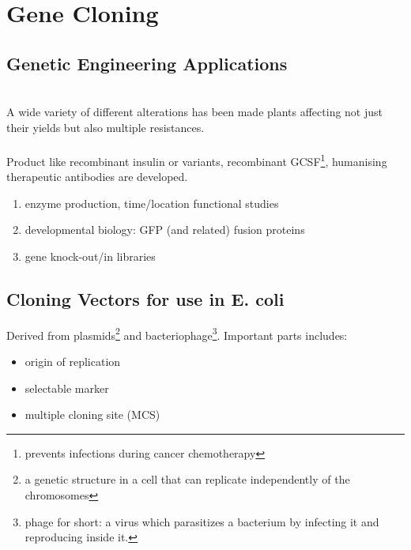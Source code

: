 \chapter{Gene Cloning}

\section{Genetic Engineering Applications}
\\[.1in]
A wide variety of different alterations has been made plants affecting not just their yields but also multiple resistances.\\[.2in]
\\[.1in]
Product like recombinant insulin or variants, recombinant GCSF\footnote{prevents infections during cancer
chemotherapy}, humanising therapeutic antibodies are developed.\\[.2in]
\begin{enumerate}[noitemsep]
    \item {} enzyme production, time/location functional studies
    \item developmental biology: GFP (and related) fusion proteins
    \item gene knock-out/in libraries
\end{enumerate}

\section{Cloning Vectors for use in E. coli}
Derived from plasmids\footnote{a genetic structure in a cell that can replicate independently of the chromosomes} and bacteriophage\footnote{phage for short: a virus which parasitizes a bacterium by infecting it and reproducing inside it.}. Important parts includes:
\begin{itemize}[noitemsep]
    \item origin of replication
    \item selectable marker
    \item multiple cloning site (MCS)
\end{itemize}

